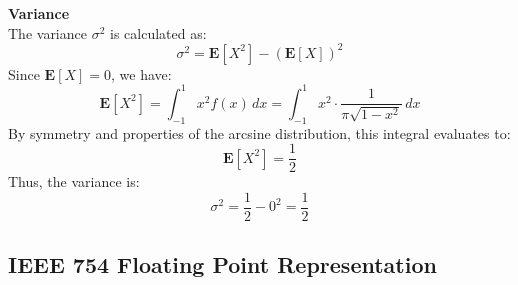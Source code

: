 \textbf{Variance}\\
The variance \(\sigma^2\) is calculated as:
\begin{equation}
    \sigma^2 = \mathbf{E}[X^2] - (\mathbf{E}[X])^2
\end{equation}
Since \(\mathbf{E}[X] = 0\), we have:
\[
\mathbf{E}[X^2] = \int_{-1}^{1} x^2 f(x) \, dx = \int_{-1}^{1} x^2 \cdot \frac{1}{\pi \sqrt{1-x^2}} \, dx
\]
By symmetry and properties of the arcsine distribution, this integral evaluates to:
\[
\mathbf{E}[X^2] = \frac{1}{2}
\]
Thus, the variance is:
\begin{equation}
    \sigma^2 = \frac{1}{2} - 0^2 = \frac{1}{2}
\end{equation}

\pagebreak

\setcounter{subsection}{3}
\subsection{IEEE 754 Floating Point Representation}
\label{app:ieee-754-fp32}

